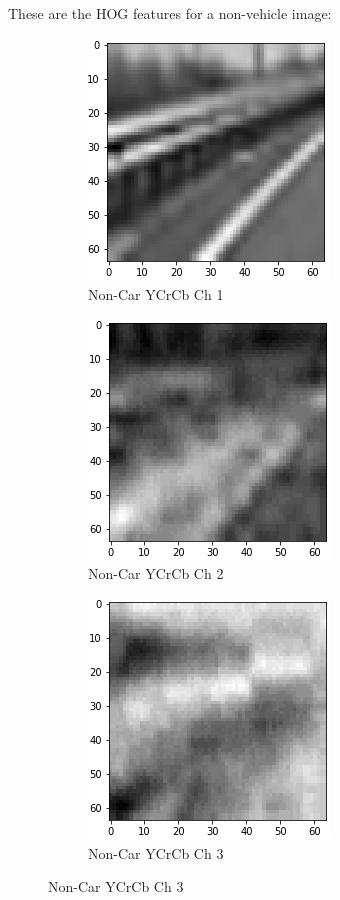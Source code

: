 \documentclass[12pt]{article}
\begin{document}
These are the HOG features for a non-vehicle image:
\begin{figure}[!h]
\centering
\begin{subfigure}{0.32\textwidth}
\centering
\includegraphics[scale=0.5]{non_car_ycrcb_ch1.png}
\caption{Non-Car YCrCb Ch 1}
\end{subfigure}
\begin{subfigure}{0.32\textwidth}
\centering
\includegraphics[scale=0.5]{non_car_ycrcb_ch2.png}
\caption{Non-Car YCrCb Ch 2}
\end{subfigure}
\begin{subfigure}{0.32\textwidth}
\centering
\includegraphics[scale=0.5]{non_car_ycrcb_ch3.png}
\caption{Non-Car YCrCb Ch 3}

\end{subfigure}
\end{figure}
\end{document}
